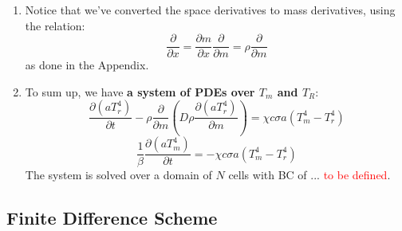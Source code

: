 \documentclass[11pt]{article}
\begin{document}
\begin{enumerate}
\begin{equation}
  \end{equation}
  \item Notice that we've converted the space derivatives to mass derivatives, using the relation:
  \begin{equation}
    \frac{\partial}{\partial x} = \frac{\partial m}{\partial x} \frac{\partial}{\partial m} = \rho \frac{\partial}{\partial m}
  \end{equation}
  as done in the Appendix.
  \item To sum up, we have \textbf{a system of PDEs over $T_m$ and $T_R$}:
  \begin{equation}
      \frac{\partial{\left(aT_r^4\right)}}{\partial t}-\rho \frac{\partial}{\partial m}\left(D \rho \frac{\partial (aT_r^4)}{\partial m}\right) = \chi c\sigma a(T_m^4-T_r^4) 
  \end{equation}
  \begin{equation}
      \frac{1}{\beta} \frac{\partial \left(aT_m^4\right)}{\partial t}=-\chi c\sigma a(T_m^4-T_r^4)
  \end{equation}
  The system is solved over a domain of $N$ cells with BC of ... \textcolor{red}{to be defined}.
\end{enumerate}
\subsection{Finite Difference Scheme}
\end{document}

